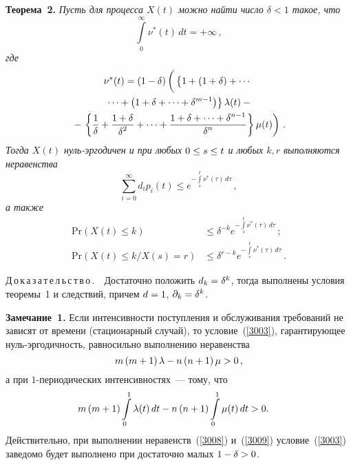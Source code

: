 \begin{multicols}{2}

\noindent
\textbf{Теорема~2.}
\textit{Пусть для процесса $X\left( t\right) $ можно найти число  $\delta < 1$ такое, что}
\begin{equation}
 \int\limits_{0}^{\infty} \nu^*(t) \, dt = + \infty\,,
\label{3003}
\end{equation}
\textit{где}
\begin{multline*}
\nu^*(t) =  \left( 1- \delta\right)\left(\vphantom{\fr{\delta^n}{\delta^n}}
\left\{ \vphantom{\delta^2} 1 + 
\left(1+\delta\right)+\cdots{}\right.\right.\\
\left.{}\cdots +\left(
1+\delta+ \cdots +\delta^{m-1}\right)\right\}\la(t) -{}\\  
{}- \left. \left\{\fr{1}{\delta} + \fr{1+\delta}{\delta^2}+
\dots+\fr{1+\delta+\dots+\delta^{n-1}}{\delta^n}\right\}\mu(t) \right)\,.
\end{multline*}
\textit{Тогда  $X\left( t\right) $ нуль-эр\-го\-ди\-чен и при любых $0 \hm\le s \hm\le t$ и 
любых $k, r$ выполняются неравенства}
\begin{equation*}
\sum_{i=0}^{\infty} d_i p_i (t) \le
e^{-\int\limits_s^t \nu^*(\tau) \, d\tau} \,,  
\end{equation*}
\textit{а также}
\begin{align*}
\mathrm{Pr} \left(X(t)  \le k \right) &\le \delta^{-k}e^{-\int\limits_s^t \nu^*(\tau) \, d\tau}\,;
\\
\mathrm{Pr} \left(X(t)  \le k / X(s) = r \right) &\le \delta^{r-k}e^{-\int\limits_s^t \nu^*(\tau) \, d\tau}\,.
\end{align*}


\noindent
Д\,о\,к\,а\,з\,а\,т\,е\,л\,ь\,с\,т\,в\,о\,.\ \ 
Достаточно положить $d_k \hm= \delta ^k$, тогда выполнены условия теоремы~1 и следствий, 
причем  ${d}\hm= 1$,  ${\partial}_k \hm= \delta ^{k}$.

\medskip

\noindent
\textbf{Замечание~1.}
Если интенсивности поступления и обслуживания требований не зависят от 
времени (стационарный случай), то условие~(\ref{3003}), гарантирующее 
нуль-эр\-го\-дич\-ность, равносильно выполнению неравенства
\begin{equation}
 m\left(m+1\right)\lambda - n\left(n+1\right)\mu > 0\,,
\label{3008}
\end{equation}
а при $1$-периодических интенсивностях~--- тому, что
\begin{equation}
\hspace*{-4mm}m\left(m+1\right)\int\limits_0^1\la(t) \, dt  - 
 n\left(n+1\right)\int\limits_0^1\mu(t) \, dt > 0.
\label{3009}
\end{equation}
Действительно, при выполнении неравенств~(\ref{3008}) и~(\ref{3009}) условие~(\ref{3003}) 
заведомо будет выполнено при достаточно малых $1\hm-\delta \hm>0$.


\end{multicols}
